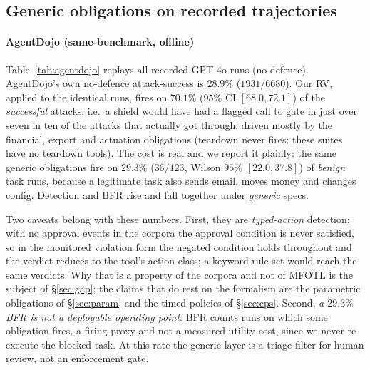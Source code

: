 \documentclass[sigconf]{acmart}
\begin{document}
\subsection{Generic obligations on recorded trajectories}

\paragraph{AgentDojo (same-benchmark, offline)} Table~\ref{tab:agentdojo} replays
 all recorded GPT-4o runs (no defence). AgentDojo's own no-defence attack-success is
$28.9\%$ ($1931/6680$). Our RV, applied to the identical runs, fires on $70.1\%$
($95\%$ CI $[68.0,72.1]$) of the \emph{successful} attacks: i.e.\ a shield would
have had a flagged call to gate in just over seven in ten of the attacks that actually got
through: driven mostly by the financial, export and actuation obligations
(teardown never fires: these suites have no teardown tools). The cost is real and we
report it plainly: the same generic obligations fire on $29.3\%$ ($36/123$, Wilson
$95\%$ $[22.0,37.8]$) of \emph{benign} task runs, because a legitimate task also sends
email, moves money and changes config. Detection and BFR rise and fall together under
\emph{generic} specs.

Two caveats belong with these numbers. First, they are \emph{typed-action} detection:
with no approval events in the corpora the approval condition is never satisfied, so in
the monitored violation form the negated condition holds throughout and the verdict
reduces to the tool's action class; a keyword rule set would reach the same verdicts. Why that is a property of the corpora and not of MFOTL is the subject of
\S\ref{sec:gap}; the claims that do rest on the formalism are the parametric obligations
of \S\ref{sec:param} and the timed policies of \S\ref{sec:cps}. Second, \emph{a $29.3\%$
BFR is not a deployable operating point}: BFR counts runs on which some obligation fires,
a firing proxy and not a measured utility cost, since we never re-execute the blocked task.
At this rate the generic layer is a triage filter for human review, not an enforcement
gate.
\end{document}
